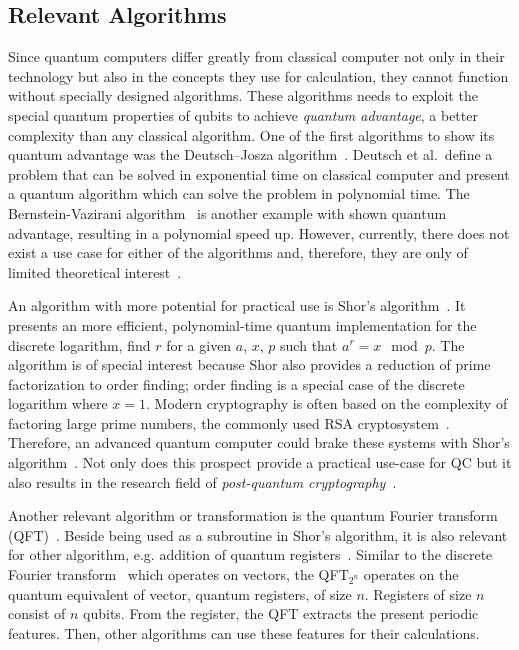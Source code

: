 \subsection{Relevant Algorithms}
\label{sec:background_algorithms}
Since quantum computers differ greatly from classical computer not only in their technology but also in the concepts they use for calculation,
they cannot function without specially designed algorithms. These algorithms needs to exploit the special quantum properties of qubits to achieve \emph{quantum advantage}, \ie a better complexity than any classical algorithm. One of the first algorithms to show its quantum advantage was the Deutsch–Josza algorithm~\cite{DeJo92}. Deutsch et al.\ define a problem that can be solved in exponential time on classical computer and present a quantum algorithm which can solve the problem in polynomial time. The Bernstein-Vazirani algorithm~\cite{BeVa93} is another example with shown quantum advantage, resulting in a polynomial speed up. However, currently, there does not exist a use case for either of the algorithms and, therefore, they are only of limited theoretical interest~\cite{DiCh20c}.  

An algorithm with more potential for practical use is Shor's algorithm~\cite{Shor97}. It presents an more efficient, polynomial-time quantum implementation for the discrete logarithm, \ie find $r$ for a given $a$, $x$, $p$ such that $a^r = x \mod p$. The algorithm is of special interest because Shor also provides a reduction of prime factorization to order finding; order finding is a special case of the discrete logarithm where $x = 1$. Modern cryptography is often based on the complexity of factoring large prime numbers,
\eg the commonly used RSA cryptosystem~\cite{RSA78}. Therefore, an advanced quantum computer could brake these systems with Shor's algorithm~\cite{MVZJ18}. Not only does this prospect provide a practical use-case for QC but it also results in the research field of \emph{post-quantum cryptography}~\cite{BeLa17}.  

Another relevant algorithm or transformation is the quantum Fourier transform (QFT)~\cite{Copp02}. Beside being used as a subroutine in Shor's algorithm, it is also relevant for other algorithm, e.g. addition of quantum registers~\cite{Drap00}. Similar to the discrete Fourier transform~\cite{Wino78} which operates on vectors, the QFT$_{2^n}$ operates on the quantum equivalent of vector, quantum registers, of size $n$. Registers of size $n$ consist of $n$ qubits. From the register, the QFT extracts the present periodic features. Then, other algorithms can use these features for their calculations.

